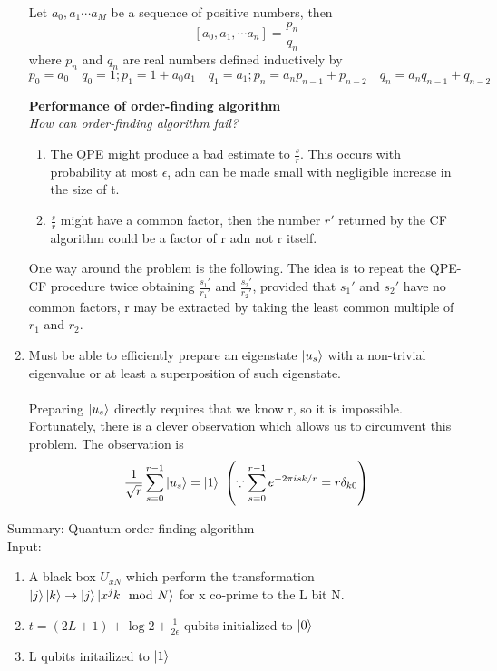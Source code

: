 \documentclass[]{article}
\theoremstyle{nonumberplain}
\begin{document}
\begin{enumerate}
\begin{theorem}
Let $a_{0},a_{1}\cdots a_{M}$ be a sequence of positive numbers, then 
\[
	[a_0,a_{1},\cdots a_{n}]=\frac{p_{n}}{q_{n}}
\] 
where $p_{n}$ and $q_{n}$ are real numbers defined inductively by
\[
p_{0} = a_{0}\quad q_{0} = 1; p_{1}=1+a_{0}a_{1}\quad q_{1}=a_{1};  p_{n} = a_{n}p_{n-1}+p_{n-2}\quad q_{n} = a_{n}q_{n-1}+q_{n-2}
\] 
\end{theorem}
\textbf{Performance of order-finding algorithm}\\
\textit{How can order-finding algorithm fail?}
\begin{enumerate}
	\item The QPE might produce a bad estimate to $\frac{s}{r}$. This occurs with probability at most $\epsilon$, adn can be made small with negligible increase in the size of t.
	\item $\frac{s}{r}$ might have a common factor, then the number $r'$ returned by the CF algorithm could be a factor of r adn not r itself.  
\end{enumerate}
One way around the problem is the following. The idea is to repeat the QPE-CF procedure twice obtaining $\frac{s_{1}'}{r_{1}'}$ and $\frac{s_{2}'}{r_{2}'}$, provided that $s_{1}'$ and $s_{2}'$ have no common factors, r may be extracted by taking the least common multiple of $r_{1}$ and $r_{2}$.
	\item Must be able to efficiently prepare an eigenstate $\ket{u_{s}}$ with a non-trivial eigenvalue or at least a superposition of such eigenstate.\\\\
	Preparing $\ket{u_{s}}$ directly requires that we know r, so it is impossible. Fortunately, there is a clever observation which allows us to circumvent this problem. The observation is 
\[
	\frac{1}{\sqrt{r}} \sum^{r-1}_{s=0} \ket{u_{s}} = \ket{1} \ \left(\because \sum^{r-1}_{s=0} e^{-2\pi i s k /r} = r\delta_{k0}\right)
\] 
\end{enumerate}
Summary: Quantum order-finding algorithm\\
Input:
\begin{enumerate}
	\item A black box $U_{xN}$ which perform the transformation $\ket{j}\ket{k}\rightarrow \ket{j}\ket{x^{j}k\mod{N}}$ for x co-prime to the L bit N. 
	\item $t = (2L+1) + \log{2+\frac{1}{2\epsilon}}$ qubits initialized to $\ket{0}$
	\item L qubits initailized to $\ket{1}$ 
\end{enumerate}
\end{document}
